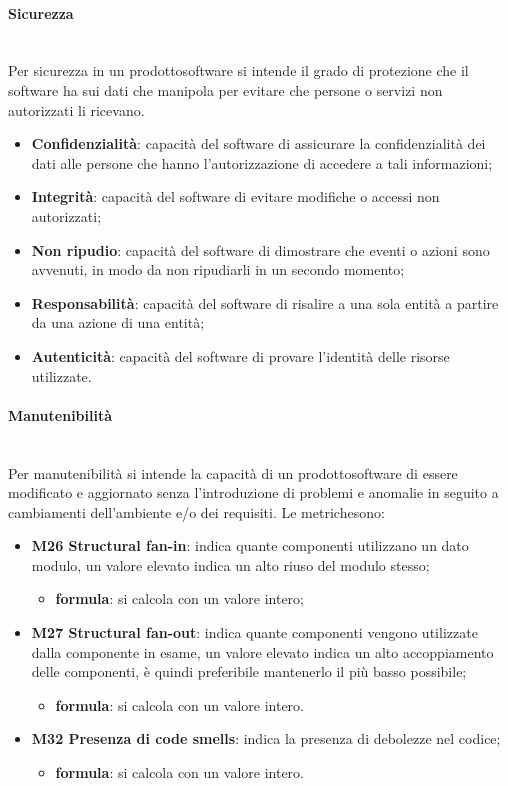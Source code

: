 	\paragraph{Sicurezza} \mbox{}\\
	Per sicurezza in un prodotto\glosp software si intende il grado di protezione che il software ha sui dati che manipola per evitare che persone o servizi non autorizzati li ricevano.
	\begin{itemize}
		\item \textbf{Confidenzialità}: capacità del software di assicurare la confidenzialità dei dati alle persone che hanno l'autorizzazione di accedere a tali informazioni;
		\item \textbf{Integrità}: capacità del software di evitare modifiche o accessi non autorizzati;
		\item \textbf{Non ripudio}: capacità del software di dimostrare che eventi o azioni sono avvenuti, in modo da non ripudiarli in un secondo momento;
		\item \textbf{Responsabilità}: capacità del software di risalire a una sola entità a partire da una azione di una entità;
		\item \textbf{Autenticità}: capacità del software di provare l'identità delle risorse utilizzate.
	\end{itemize}

	\paragraph{Manutenibilità} \mbox{}\\[1mm]
	Per manutenibilità si intende la capacità di un prodotto\glosp software di essere modificato e aggiornato senza l'introduzione di problemi e anomalie in seguito a cambiamenti dell'ambiente e/o dei requisiti.
	Le metriche\glosp sono:
	\begin{itemize}
		\item \textbf{M26 Structural fan-in}: indica quante componenti utilizzano un dato modulo, un valore elevato indica un alto riuso del modulo stesso;
		\begin{itemize}
			\item[] \textbf{formula}: si calcola con un valore intero;
		\end{itemize}
		\item \textbf{M27 Structural fan-out}: indica quante componenti vengono utilizzate dalla componente in esame, un valore elevato indica un alto accoppiamento delle componenti, è quindi preferibile mantenerlo il più basso possibile;
		\begin{itemize}
			\item[] \textbf{formula}: si calcola con un valore intero.
		\end{itemize}
		\item \textbf{M32 Presenza di code smells}: indica la presenza di debolezze nel codice;
		\begin{itemize}
			\item[] \textbf{formula}: si calcola con un valore intero.
		\end{itemize}
	\end{itemize}
